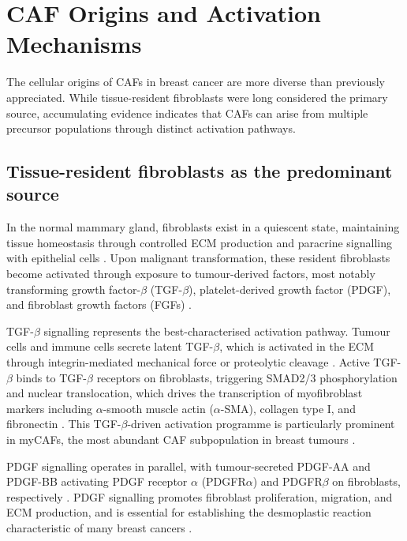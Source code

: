 \section{CAF Origins and Activation Mechanisms}
\label{sec:origins}

The cellular origins of CAFs in breast cancer are more diverse than previously appreciated. While tissue-resident fibroblasts were long considered the primary source, accumulating evidence indicates that CAFs can arise from multiple precursor populations through distinct activation pathways.

\subsection{Tissue-resident fibroblasts as the predominant source}

In the normal mammary gland, fibroblasts exist in a quiescent state, maintaining tissue homeostasis through controlled ECM production and paracrine signalling with epithelial cells \citep{plaks2015mammary}. Upon malignant transformation, these resident fibroblasts become activated through exposure to tumour-derived factors, most notably transforming growth factor-$\beta$ (TGF-$\beta$), platelet-derived growth factor (PDGF), and fibroblast growth factors (FGFs) \citep{kalluri2016biology}.

TGF-$\beta$ signalling represents the best-characterised activation pathway. Tumour cells and immune cells secrete latent TGF-$\beta$, which is activated in the ECM through integrin-mediated mechanical force or proteolytic cleavage \citep{shi2011latent}. Active TGF-$\beta$ binds to TGF-$\beta$ receptors on fibroblasts, triggering SMAD2/3 phosphorylation and nuclear translocation, which drives the transcription of myofibroblast markers including $\alpha$-smooth muscle actin ($\alpha$-SMA), collagen type I, and fibronectin \citep{derynck2001smad}. This TGF-$\beta$-driven activation programme is particularly prominent in myCAFs, the most abundant CAF subpopulation in breast tumours \citep{erve2024}.

PDGF signalling operates in parallel, with tumour-secreted PDGF-AA and PDGF-BB activating PDGF receptor $\alpha$ (PDGFR$\alpha$) and PDGFR$\beta$ on fibroblasts, respectively \citep{ostman2001pdgf}. PDGF signalling promotes fibroblast proliferation, migration, and ECM production, and is essential for establishing the desmoplastic reaction characteristic of many breast cancers \citep{shao2016osteonectin}.

